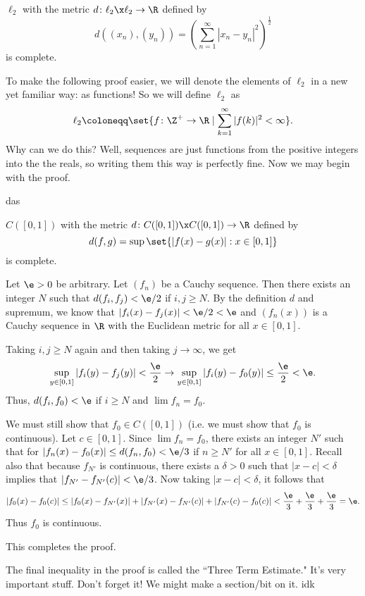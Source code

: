 \documentclass[class=article, crop=false]{standalone}
\begin{document}
\begin{fact}
    $\ell_2$ with the metric $d \colon \ell_2 \x \ell_2 \to \R$ defined by
        \[
            d((x_n),(y_n)) = \left( \sum_{n=1}^{\infty} |x_n-y_n|^2 \right)^{\frac{1}{2}}
        \]
    is complete.
\end{fact}

To make the following proof easier, we will denote the elements of $\ell_2$ in a new yet familiar way: as functions! So we will define $\ell_2$ as
    \[
        \ell_2 \coloneqq \set{f \colon \Z^+ \to \R \mid \sum_{k=1}^{\infty} |f(k)|^2 < \infty}.
    \]
Why can we do this? Well, sequences are just functions from the positive integers into the the reals, so writing them this way is perfectly fine. Now we may begin with the proof.
\begin{pf}
    das
\end{pf}



\begin{fact}
    $C([0,1])$ with the metric $d \colon C([0,1]) \x C([0,1]) \to \R$ defined by
        \[
            d(f,g) = \sup \set{|f(x)-g(x)| : x \in [0,1]}
        \]
    is complete.
\end{fact}
\begin{pf}
    Let $\e > 0$ be arbitrary. Let $(f_n)$ be a Cauchy sequence. Then there exists an integer $N$ such that $d(f_i,f_j) < \e/2$ if $i,j \geq N$. By the definition $d$ and supremum, we know that $|f_i(x)-f_j(x)| < \e/2 < \e$ and $(f_n(x))$ is a Cauchy sequence in $\R$ with the Euclidean metric for all $x \in [0,1]$.

    Taking $i,j \geq N$ again and then taking $j \to \infty$, we get
        \[
            \sup_{y \in [0,1]} |f_i(y)-f_j(y)| < \frac{\e}{2} \to \sup_{y \in [0,1]}|f_i(y)-f_0(y)| \leq \frac{\e}{2} < \e.
        \]
    Thus, $d(f_i,f_0) < \e$ if $i \geq N$ and $\lim f_n =f_0$.

    We must still show that $f_0 \in C([0,1])$ (i.e. we must show that $f_0$ is continuous). Let $c \in [0,1]$. Since $\lim f_n = f_0$, there exists an integer $N'$ such that for $|f_n(x)-f_0(x)| \leq d(f_n,f_0) < \e/3$ if $n \geq N'$ for all $x \in [0,1]$. Recall also that because $f_{N'}$ is continuous, there exists a $\delta > 0$ such that $|x-c| < \delta$
    implies that $|f_{N'}-f_{N'}(c)| < \e/3$. Now taking $|x-c| < \delta$, it follows that
        \[
            |f_0(x)-f_0(c)| \leq |f_0(x) - f_{N'}(x)| + |f_{N'}(x)-f_{N'}(c)| + |f_{N'}(c)-f_0(c)| < \frac{\e}{3}+\frac{\e}{3}+\frac{\e}{3} = \e.
        \]
    Thus $f_0$ is continuous.

    This completes the proof.
\end{pf}
\begin{rem}
    The final inequality in the proof is called the ``Three Term Estimate." It's very important stuff. Don't forget it! We might make a section/bit on it. idk
\end{rem}
\end{document}
